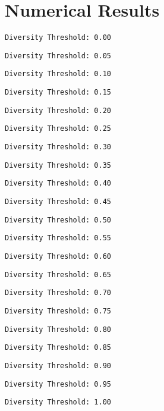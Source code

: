 \documentclass{article}
\begin{document}
\section{Numerical Results}
\verb|Diversity Threshold: 0.00|

\newpage
\verb|Diversity Threshold: 0.05|

\newpage
\verb|Diversity Threshold: 0.10|

\newpage
\verb|Diversity Threshold: 0.15|

\newpage
\verb|Diversity Threshold: 0.20|

\newpage
\verb|Diversity Threshold: 0.25|

\newpage
\verb|Diversity Threshold: 0.30|

\newpage
\verb|Diversity Threshold: 0.35|

\newpage
\verb|Diversity Threshold: 0.40|

\newpage
\verb|Diversity Threshold: 0.45|

\newpage
\verb|Diversity Threshold: 0.50|

\newpage
\verb|Diversity Threshold: 0.55|

\newpage
\verb|Diversity Threshold: 0.60|

\newpage
\verb|Diversity Threshold: 0.65|

\newpage
\verb|Diversity Threshold: 0.70|

\newpage
\verb|Diversity Threshold: 0.75|

\newpage
\verb|Diversity Threshold: 0.80|

\newpage
\verb|Diversity Threshold: 0.85|

\newpage
\verb|Diversity Threshold: 0.90|

\newpage
\verb|Diversity Threshold: 0.95|

\newpage
\verb|Diversity Threshold: 1.00|

\newpage
\newpage
\end{document}
